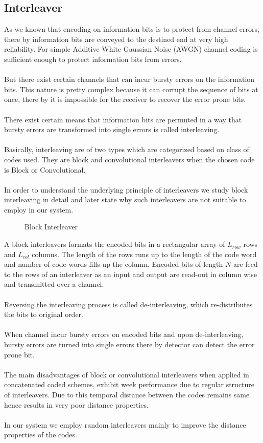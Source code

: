 \subsection{Interleaver}
As we known that encoding on information bits is to protect from channel errors, there by information bits are conveyed to the destined end at very high reliability. For simple Additive White Gaussian Noise (AWGN) channel coding is sufficient enough to protect information bits from errors. \\ \\
But there exist certain channels that can incur bursty errors on the information bits. This nature is pretty complex because it can corrupt the sequence of bits at once, there by it is impossible for the receiver to recover the error prone bits. \\ \\
There exist certain means that information bits are permuted in a way that bursty errors are transformed into single errors is called interleaving. \\ \\
Basically, interleaving are of two types which are categorized based on class of codes used. They are block and convolutional interleavers when the chosen code is Block or Convolutional. \\ \\
In order to understand the underlying principle of interleavers we study block interleaving in detail and later state why such interleavers are not suitable to employ in our system.
\begin{figure}[htb]
\centerline{  }
\caption{Block Interleaver}
\end{figure}
A block interleavers formats the encoded bits in a rectangular array of $L_{row}$ rows and $L_{col}$ columns. The length of the rows runs up to the length of the code word and number of code words fills up the column. Encoded bits of length $N$ are feed to the rows of an interleaver as an input and output are read-out in column wise and transmitted over a channel. \\ \\
Reversing the interleaving process is called de-interleaving, which re-distributes the bits to original order. \\ \\
When channel incur bursty errors on encoded bits and upon de-interleaving, bursty errors are turned into single errors there by detector can detect the error prone bit. \\ \\
The main disadvantages of block or convolutional interleavers when applied in concatenated coded schemes, exhibit week performance due to regular structure of interleavers. Due to this temporal distance between the codes remains same hence results in very poor distance properties. \\ \\
In our system we employ random interleavers mainly to improve the distance properties of the codes.
